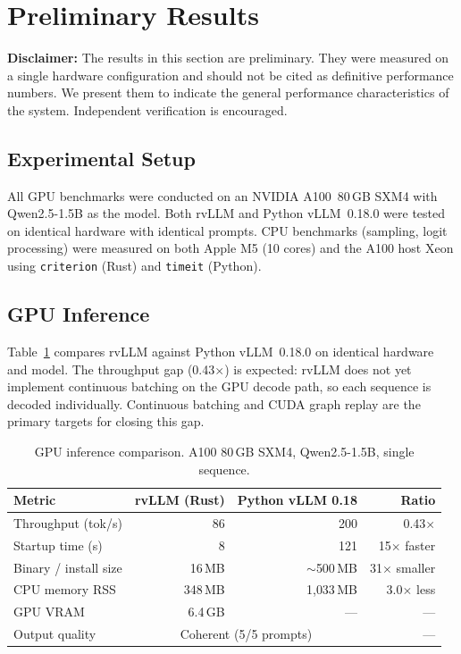 \documentclass[11pt,a4paper]{article}
\newcommand{\thead}[1]{\textbf{\color{white}#1}}
\begin{document}
\section{Preliminary Results}
\label{sec:results}

\textbf{Disclaimer:} The results in this section are preliminary. They were measured
on a single hardware configuration and should not be cited as definitive performance
numbers. We present them to indicate the general performance characteristics of the
system. Independent verification is encouraged.

\subsection{Experimental Setup}

All GPU benchmarks were conducted on an NVIDIA A100~80\,GB SXM4 with
Qwen2.5-1.5B as the model. Both rvLLM and Python vLLM~0.18.0 were tested on
identical hardware with identical prompts. CPU benchmarks (sampling, logit processing)
were measured on both Apple M5 (10 cores) and the A100 host Xeon using
\texttt{criterion} (Rust) and \texttt{timeit} (Python).

\subsection{GPU Inference}

Table~\ref{tab:gpu_bench} compares rvLLM against Python vLLM~0.18.0 on identical
hardware and model. The throughput gap (0.43$\times$) is expected: rvLLM does not
yet implement continuous batching on the GPU decode path, so each sequence is decoded
individually. Continuous batching and CUDA graph replay are the primary targets for
closing this gap.

\begin{table}[t]
  \centering
  \caption{GPU inference comparison. A100 80\,GB SXM4, Qwen2.5-1.5B, single sequence.}
  \label{tab:gpu_bench}
  \small
  \begin{tabular}{@{}lrrr@{}}
    \toprule
    \rowcolor{HeaderGray} \thead{Metric} & \thead{rvLLM (Rust)} & \thead{Python vLLM 0.18} & \thead{Ratio} \\
    \midrule
    Throughput (tok/s)       & 86            & 200           & 0.43$\times$ \\
    \rowcolor{gray!8}
    Startup time (s)         & 8             & 121           & 15$\times$ faster \\
    Binary / install size    & 16\,MB        & $\sim$500\,MB & 31$\times$ smaller \\
    \rowcolor{gray!8}
    CPU memory RSS           & 348\,MB       & 1{,}033\,MB   & 3.0$\times$ less \\
    GPU VRAM                 & 6.4\,GB       & ---           & --- \\
    \rowcolor{gray!8}
    Output quality           & \multicolumn{2}{c}{Coherent (5/5 prompts)} & --- \\
    \bottomrule
  \end{tabular}
\end{table}
\end{document}
